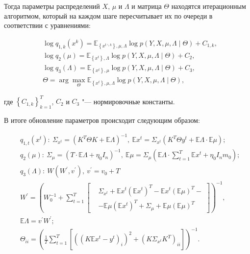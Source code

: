 Тогда параметры распределений $X$, $\mu$ и $\Lambda$ и матрица $\Theta$ находятся итерационным алгоритмом, который на каждом шаге пересчитывает их по очереди в соответствии с уравнениями:

\begin{align*}
	&\log{q_{1,k}\left(x^k\right)}=\mathbb{E}_{\left\{x^{t \backslash k}\right\},\mu,\Lambda}\log{p\left(Y,X,\mu,\Lambda\mid\Theta\right)}+C_{1,k}, \\
	&\log{q_2\left(\mu\right)}=\mathbb{E}_{\left\{x^t\right\},\Lambda}\log{p\left(Y,X,\mu,\Lambda\mid\Theta\right)}+C_2, \\
	&\log{q_3\left(\Lambda\right)}=\mathbb{E}_{\left\{x^t\right\},\mu}\log{p\left(Y,X,\mu,\Lambda\mid\Theta\right)}+C_3, \\
	&\Theta=\arg{\max_\Theta{\mathbb{E}_{\left\{x^t\right\},\mu,\Lambda}\log{p\left(Y,X,\mu,\Lambda\mid\Theta\right)}}},
\end{align*}

\noindent где $\left\{C_{1,k}\right\}_{k=1}^T$, $C_2$ и $C_3$ "--- нормировочные константы.

В итоге обновление параметров происходит следующим образом:

\begin{align*}
	&q_{1,t}\left(x^t\right):\ \Sigma_{x^t}=\left(K^T\Theta K+\mathbb{E}\Lambda\right)^{-1},\ \mathbb{E}x^t=\Sigma_{x^t}\left(K^T\Theta y^t+\mathbb{E}\Lambda\cdot\mathbb{E}\mu\right); \\
	&q_2\left(\mu\right):\ \Sigma_\mu=\left(T\cdot\mathbb{E}\Lambda+\eta_0I_n\right)^{-1},\ \mathbb{E}\mu=\Sigma_\mu\left(\mathbb{E}\Lambda\cdot\sum_{t=1}^{T}{\mathbb{E}x^t}+\eta_0I_nm_0\right); \\
	&q_3\left(\Lambda\right):\ W\left(W^\prime,v^\prime\right),\ v^\prime=v_0+T \\
	&W^\prime=\left(W_0^{-1}+\sum_{t=1}^{T}\left[
	\begin{aligned}
		&\Sigma_{x^t} + \mathbb{E}x^t\left(\mathbb{E}x^t\right)^T - \mathbb{E}x^t\left(\mathbb{E}\mu\right)^T - \\
		&- \mathbb{E}\mu\left(\mathbb{E}x^t\right)^T + \Sigma_\mu + \mathbb{E}\mu\left(\mathbb{E}\mu\right)^T
	\end{aligned}
	\right]\right)^{-1}, \\
	&\mathbb{E}\Lambda=v^\prime W^\prime; \\
	&\Theta_{ii}=\left(\frac{1}{T}\sum_{t=1}^{T}\left[\left(\left(K\mathbb{E}x^t - y^t\right)_i\right)^2 + \left(K\Sigma_{x^t}K^T\right)_{ii}\right]\right)^{-1}.
\end{align*}

